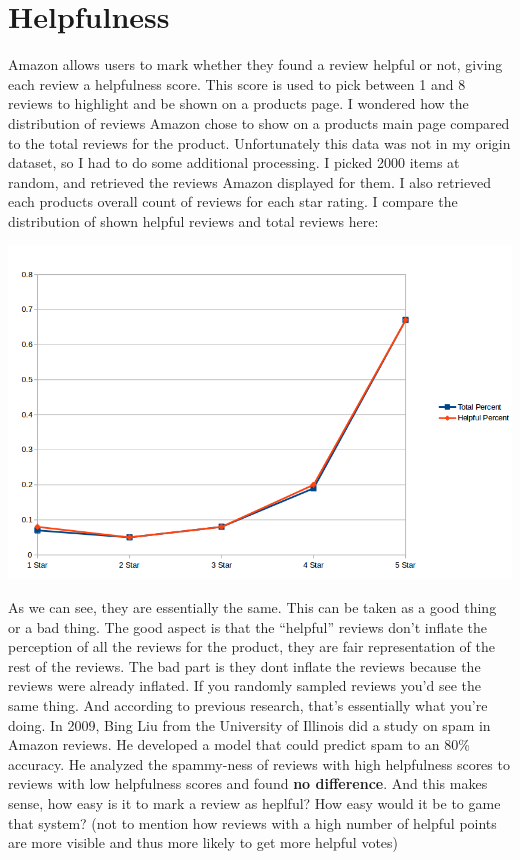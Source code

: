 \documentclass[a4paper,10pt]{article}
\begin{document}
\section*{Helpfulness}
Amazon allows users to mark whether they found a review helpful or not, giving each review a helpfulness score. This score is used to pick between 1 and 8 reviews to highlight and be shown on a products page. I wondered how the distribution of reviews Amazon chose to show on a products main page compared to the total reviews for the product. Unfortunately this data was not in my origin dataset, so I had to do some additional processing. I picked 2000 items at random, and retrieved the reviews Amazon displayed for them. I also retrieved each products overall count of reviews for each star rating. I compare the distribution of shown helpful reviews and total reviews here:
\begin{center}
    \includegraphics[scale=0.3]{helpfulness.png}
\end{center}
As we can see, they are essentially the same. This can be taken as a good thing or a bad thing. The good aspect is that the \enquote{helpful} reviews don't inflate the perception of all the reviews for the product, they are fair representation of the rest of the reviews. The bad part is they dont inflate the reviews because the reviews were already inflated. If you randomly sampled reviews you'd see the same thing. And according to previous research, that's essentially what you're doing. In 2009, Bing Liu from the University of Illinois did a study on spam in Amazon reviews. He developed a model that could predict spam to an 80\% accuracy. He analyzed the spammy-ness of reviews with high helpfulness scores to reviews with low helpfulness scores and found \textbf{no difference}. And this makes sense, how easy is it to mark a review as heplful? How easy would it be to game that system? (not to mention how reviews with a high number of helpful points are more visible and thus more likely to get more helpful votes)
\end{document}
